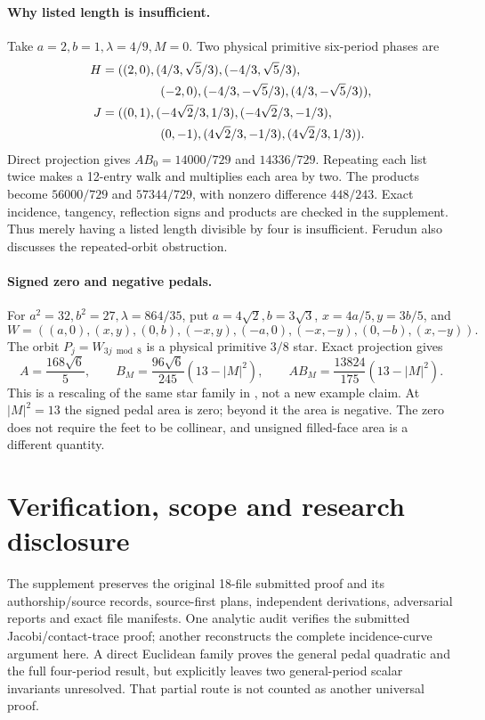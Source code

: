 \documentclass[11pt]{article}
\begin{document}
\paragraph{Why listed length is insufficient.}
Take \(a=2,b=1,\lambda=4/9,M=0\).
Two physical primitive six-period phases are
\[
 \begin{split}
 H={}&((2,0),(4/3,\sqrt5/3),(-4/3,\sqrt5/3),\\
     &\hspace{12mm}(-2,0),(-4/3,-\sqrt5/3),(4/3,-\sqrt5/3)),\\
 J={}&((0,1),(-4\sqrt2/3,1/3),(-4\sqrt2/3,-1/3),\\
     &\hspace{12mm}(0,-1),(4\sqrt2/3,-1/3),(4\sqrt2/3,1/3)).
 \end{split}
\]
Direct projection gives \(A B_0=14000/729\) and \(14336/729\).
Repeating each list twice makes a 12-entry walk and multiplies
each area by two. The products become \(56000/729\) and \(57344/729\),
with nonzero difference \(448/243\).
Exact incidence, tangency, reflection signs and products are checked
in the supplement. Thus merely having a listed length divisible
by four is insufficient. Ferudun \cite[Section~1.4 and Section~6]{ferudun}
also discusses the repeated-orbit obstruction.

\paragraph{Signed zero and negative pedals.}
For \(a^2=32,b^2=27,\lambda=864/35\), put \(a=4\sqrt2,b=3\sqrt3\),
\(x=4a/5,y=3b/5\), and
\[
 W=((a,0),(x,y),(0,b),(-x,y),(-a,0),(-x,-y),(0,-b),(x,-y)).
\]
The orbit \(P_j=W_{3j\bmod8}\) is a physical primitive \(3/8\) star.
Exact projection gives
\[
 A=\frac{168\sqrt6}{5},\qquad
 B_M=\frac{96\sqrt6}{245}(13-|M|^2),\qquad
 A B_M=\frac{13824}{175}(13-|M|^2).
\]
This is a rescaling of the same star family in
\cite[Table~2, p.~14]{ferudun}, not a new example claim.
At \(|M|^2=13\) the signed pedal area is zero; beyond it the area
is negative. The zero does not require the feet to be collinear,
and unsigned filled-face area is a different quantity.

\section{Verification, scope and research disclosure}
The supplement preserves the original 18-file submitted proof and
its authorship/source records, source-first plans, independent
derivations, adversarial reports and exact file manifests.
One analytic audit verifies the submitted Jacobi/contact-trace proof;
another reconstructs the complete incidence-curve argument here.
A direct Euclidean family proves the general pedal quadratic and
the full four-period result, but explicitly leaves two general-period
scalar invariants unresolved. That partial route is not counted as
another universal proof.
\end{document}
